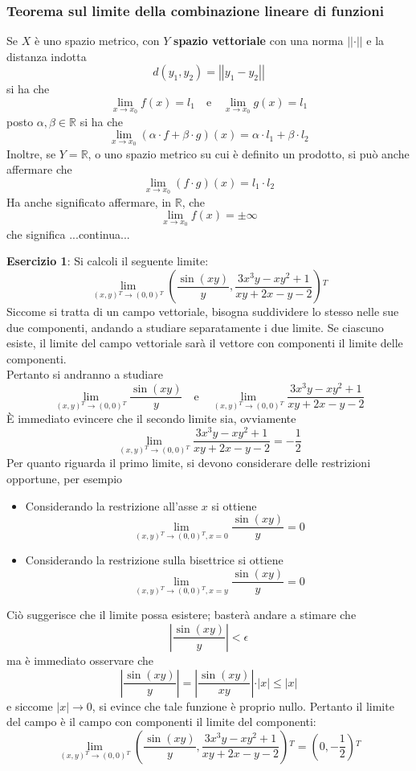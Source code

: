 \documentclass[a4paper]{extarticle}
\begin{document}
\vspace{1em}
\noindent
\subsubsection{Teorema sul limite della combinazione lineare di funzioni}
Se $X$ è uno spazio metrico, con $Y$ \textbf{spazio vettoriale} con una norma $\vert \vert \cdot \vert \vert$ e la distanza indotta
\[d(y_1,y_2) = \left \vert \left \vert y_1-y_2 \right \vert \right \vert\]
si ha che
\[\lim_{x \to x_0} f(x) = l_1 \hspace{1em} \text{e} \hspace{1em} \lim_{x \to x_0} g(x) = l_1\]
posto $\alpha, \beta \in \mathbb{R}$ si ha che
\[\lim_{x \to x_0} \left(\alpha \cdot f + \beta \cdot g\right)(x) = \alpha \cdot l_1 + \beta \cdot l_2\]
Inoltre, se $Y=\mathbb{R}$, o uno spazio metrico su cui è definito un prodotto, si può anche affermare che
\[\lim_{x \to x_0} (f \cdot g)(x) = l_1 \cdot l_2\]
Ha anche significato affermare, in $\mathbb{R}$, che
\[\lim_{x \to x_0} f(x) = \pm \infty\]
che significa ...continua...

\vspace{1em}
\noindent
\textbf{Esercizio 1}: Si calcoli il seguente limite:
\[\lim_{(x,y){^T} \to (0,0){^T}} \left(\frac{\sin(xy)}{y}, \frac{3x^3y-xy^2+1}{xy+2x-y-2}\right){^T}\]
Siccome si tratta di un campo vettoriale, bisogna suddividere lo stesso nelle sue due componenti, andando a studiare separatamente i due limite. Se ciascuno esiste, il limite del campo vettoriale sarà il vettore con componenti il limite delle componenti.\\
Pertanto si andranno a studiare
\[\lim_{(x,y){^T} \to (0,0){^T}} \frac{\sin(xy)}{y} \hspace{1em} \text{e} \hspace{1em} \lim_{(x,y){^T} \to (0,0){^T}} \frac{3x^3y-xy^2+1}{xy+2x-y-2}\]
È immediato evincere che il secondo limite sia, ovviamente
\[\lim_{(x,y){^T} \to (0,0){^T}} \frac{3x^3y-xy^2+1}{xy+2x-y-2}=-\frac{1}{2}\]
Per quanto riguarda il primo limite, si devono considerare delle restrizioni opportune, per esempio
\begin{itemize}
    \item Considerando la restrizione all'asse $x$ si ottiene
    \[\lim_{(x,y){^T} \to (0,0){^T}, x=0} \frac{\sin(xy)}{y} = 0\]
    \item Considerando la restrizione sulla bisettrice si ottiene
    \[\lim_{(x,y){^T} \to (0,0){^T}, x=y} \frac{\sin(xy)}{y} = 0\]
\end{itemize}
Ciò suggerisce che il limite possa esistere; basterà andare a stimare che
\[\left \vert \frac{\sin(xy)}{y} \right \vert < \epsilon\]
ma è immediato osservare che 
\[\left \vert \frac{\sin(xy)}{y} \right \vert = \left \vert \frac{\sin(xy)}{xy} \right \vert \cdot \vert x \vert \leq \vert x \vert\]
e siccome $\vert x \vert \to 0$, si evince che tale funzione è proprio nullo. Pertanto il limite del campo è il campo con componenti il limite del componenti:
\[\lim_{(x,y){^T} \to (0,0){^T}} \left(\frac{\sin(xy)}{y}, \frac{3x^3y-xy^2+1}{xy+2x-y-2}\right){^T} = \left(0,-\frac{1}{2}\right){^T}\]
\end{document}
